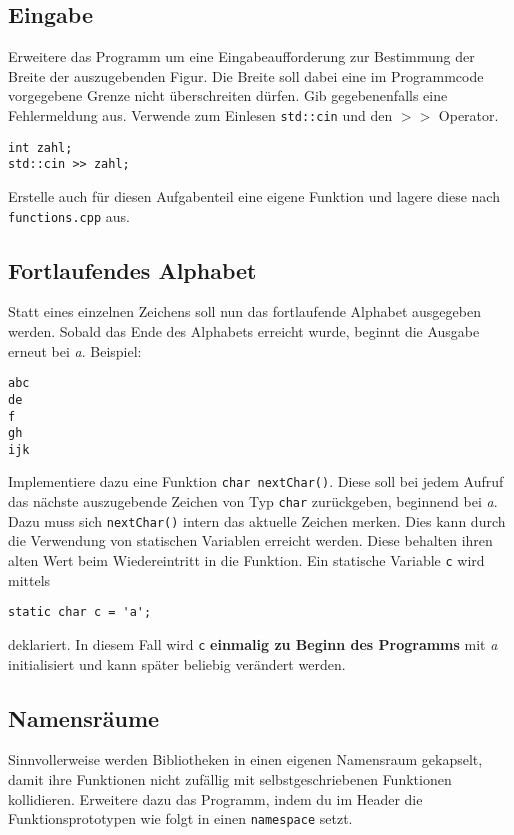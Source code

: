 \subsection{Eingabe}
Erweitere das Programm um eine Eingabeaufforderung zur Bestimmung der Breite der auszugebenden Figur.
Die Breite soll dabei eine im Programmcode vorgegebene Grenze nicht überschreiten dürfen.
Gib gegebenenfalls eine Fehlermeldung aus.
Verwende zum Einlesen \texttt{std::cin} und den $>>$ Operator.

\begin{lstlisting}
int zahl;
std::cin >> zahl;
\end{lstlisting}

Erstelle auch für diesen Aufgabenteil eine eigene Funktion und lagere diese nach \texttt{functions.cpp} aus.

\subsection{Fortlaufendes Alphabet}
Statt eines einzelnen Zeichens soll nun das fortlaufende Alphabet ausgegeben werden.
Sobald das Ende des Alphabets erreicht wurde, beginnt die Ausgabe erneut bei \emph{a}.
Beispiel:

\begin{lstlisting}
abc
de
f
gh
ijk
\end{lstlisting}

Implementiere dazu eine Funktion \texttt{char nextChar()}.
Diese soll bei jedem Aufruf das nächste auszugebende Zeichen von Typ \texttt{char} zurückgeben, beginnend bei \emph{a}.
Dazu muss sich \texttt{nextChar()} intern das aktuelle Zeichen merken.
Dies kann durch die Verwendung von statischen Variablen erreicht werden. Diese behalten ihren alten Wert beim Wiedereintritt in die Funktion.
Ein statische Variable \texttt{c} wird mittels

\begin{lstlisting}
static char c = 'a';
\end{lstlisting}

deklariert.
In diesem Fall wird \texttt{c} \textbf{einmalig zu Beginn des Programms} mit \emph{a} initialisiert und kann später beliebig verändert werden.

\subsection{Namensräume}
Sinnvollerweise werden Bibliotheken in einen eigenen Namensraum gekapselt, damit ihre Funktionen nicht zufällig mit selbstgeschriebenen Funktionen kollidieren.
Erweitere dazu das Programm, indem du im Header die Funktionsprototypen wie folgt in einen \texttt{namespace} setzt.

